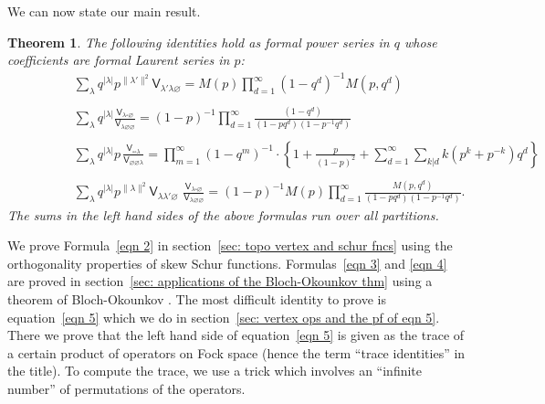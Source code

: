\documentclass[12pt]{amsart}
\newcommand{\Vsf}{\mathsf{V}}
\newcommand{\bx}{\square}
\renewcommand{\emptyset}{\varnothing}
\newtheorem{theorem}{Theorem}%
\theoremstyle{definition}
\begin{document}
We can now state our main result.

\begin{theorem}\label{thm: main formulas}
The following identities hold as formal power series in $q$ whose
coefficients are formal Laurent series in $p$:
\begin{align}
&\sum_{\lambda} q^{|\lambda |} p^{\| \lambda' \| ^{2}} \Vsf_{\lambda'
\lambda \emptyset }=  M(p) \prod_{d=1}^{\infty} (1-q^{d})^{-1}M(p,q^{d})\label{eqn 2}\\
\quad\nonumber \\
&\sum_{\lambda} q^{|\lambda |}\frac{\Vsf_{\lambda
\bx\emptyset}}{\Vsf_{\lambda \emptyset \emptyset}} =
(1-p)^{-1}\prod_{d=1}^{\infty} \frac{(1-q^{d})}{(1-pq^{d})(1-p^{-1}q^{d})}\label{eqn 3}\\
\quad\nonumber \\
&\sum_{\lambda} q^{|\lambda |} p \, \frac{\Vsf_{\bx \bx 
\lambda}}{\Vsf_{\emptyset \emptyset \lambda}} =
\prod_{m=1}^{\infty}(1-q^{m})^{-1}\cdot \left\{
1+\frac{p}{(1-p)^{2}}+\sum_{d=1}^{\infty}\sum_{k|d}k(p^{k}+p^{-k})q^{d}\right\}\label{eqn 4}\\
\quad&\quad \nonumber \\
\quad \quad \quad \quad &\sum_{\lambda} q^{|\lambda |} p^{\| \lambda \| ^{2}}
\Vsf_{\lambda \lambda' \emptyset} \,\,\frac{\Vsf_{\lambda \bx \emptyset}}{\Vsf_{\lambda \emptyset
\emptyset}} =
(1-p)^{-1}M(p)\prod_{d=1}^{\infty}
\frac{M(p,q^{d})}{(1-pq^{d})(1-p^{-1}q^{d})}. \label{eqn 5}
\end{align}
The sums in the left hand sides of the above formulas run over all
partitions. 
\end{theorem}





We prove Formula~\eqref{eqn 2} in section~\ref{sec: topo vertex and
schur fncs} using the orthogonality properties of skew Schur
functions. Formulas~\eqref{eqn 3} and \eqref{eqn 4} are proved in
section~\ref{sec: applications of the Bloch-Okounkov thm} using a
theorem of Bloch-Okounkov \cite{Bloch-Okounkov}. The most difficult
identity to prove is equation~\eqref{eqn 5} which we do in
section~\ref{sec: vertex ops and the pf of eqn 5}. There we prove that
the left hand side of equation~\eqref{eqn 5} is given as the trace of
a certain product of operators on Fock space (hence the term ``trace identities'' in the title). To compute the trace, we
use a trick which involves an ``infinite number'' of permutations of
the operators.
\end{document}
